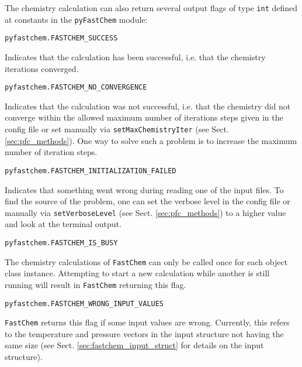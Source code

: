 \documentclass[numbers=noenddot]{aux/fcmanual}
\newcommand{\fc}{\texttt{FastChem}\xspace}
\newcommand{\pfc}{\texttt{pyFastChem}\xspace}
\begin{document}
The chemistry calculation can also return several output flags of type \lstinline!int! defined at constants in the \pfc module:

\lstinline!pyfastchem.FASTCHEM_SUCCESS!
\begin{addmargin}[25pt]{0pt}
  Indicates that the calculation has been successful, i.e. that the chemistry iterations converged.
\end{addmargin}
  
\bigbreak
  
\lstinline!pyfastchem.FASTCHEM_NO_CONVERGENCE!
\begin{addmargin}[25pt]{0pt}
  Indicates that the calculation was not successful, i.e. that the chemistry did not converge within the allowed maximum number of iterations steps given in the config file or set manually via \lstinline!setMaxChemistryIter! (see Sect. \ref{sec:pfc_methods}). One way to solve such a problem is to increase the maximum number of iteration steps.
\end{addmargin}
    
\bigbreak
    
\lstinline!pyfastchem.FASTCHEM_INITIALIZATION_FAILED!
\begin{addmargin}[25pt]{0pt}
  Indicates that something went wrong during reading one of the input files. To find the source of the problem, one can set the verbose level in the config file or manually via \lstinline!setVerboseLevel! (see Sect. \ref{sec:pfc_methods}) to a higher value and look at the terminal output.
\end{addmargin}
      
\bigbreak
      
\lstinline!pyfastchem.FASTCHEM_IS_BUSY!
\begin{addmargin}[25pt]{0pt}
  The chemistry calculations of \fc can only be called once for each object class instance. Attempting to start a new calculation while another is still running will result in \fc returning this flag.
\end{addmargin}
        
\bigbreak
        
\lstinline!pyfastchem.FASTCHEM_WRONG_INPUT_VALUES!
\begin{addmargin}[25pt]{0pt}
  \fc returns this flag if some input values are wrong. Currently, this refers to the temperature and pressure vectors in the input structure not having the same size (see Sect. \ref{sec:fastchem_input_struct} for details on the input structure).
\end{addmargin}
\end{document}
